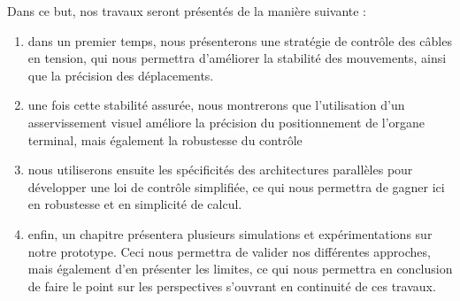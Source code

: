 Dans ce but, nos travaux seront pr\'esent\'es de la mani\`ere suivante : 
\begin{enumerate}
 \item dans un premier temps, nous pr\'esenterons une strat\'egie de contr\^ole
des c\^ables en tension, qui nous permettra d'am\'eliorer la stabilit\'e des
mouvements, ainsi que la pr\'ecision des d\'eplacements.
 \item une fois cette stabilit\'e assur\'ee, nous montrerons que l'utilisation
d'un asservissement visuel am\'eliore la pr\'ecision du positionnement de
l'organe terminal, mais \'egalement la robustesse du contr\^ole
 \item nous utiliserons ensuite les sp\'ecificit\'es des architectures
parall\`eles pour d\'evelopper une loi de contr\^ole simplifi\'ee, ce qui nous
permettra de gagner ici en robustesse et en simplicit\'e de calcul.
 \item enfin, un chapitre pr\'esentera plusieurs simulations et
exp\'erimentations sur notre prototype. Ceci nous permettra de valider nos
diff\'erentes approches, mais \'egalement d'en pr\'esenter les limites, ce qui
nous permettra en conclusion de faire le point sur les perspectives s'ouvrant
en continuit\'e de ces travaux.
\end{enumerate}




